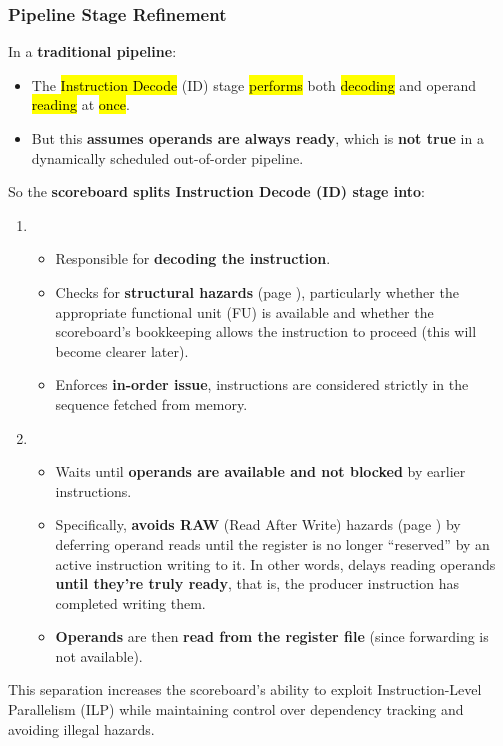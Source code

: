 \subsubsection{Pipeline Stage Refinement}

In a \textbf{traditional pipeline}:
\begin{itemize}
    \item The \hl{Instruction Decode} (ID) stage \hl{performs} both \hl{decoding} and operand \hl{reading} at \hl{once}.
    \item But this \textbf{assumes operands are always ready}, which is \textbf{not true} in a dynamically scheduled out-of-order pipeline.
\end{itemize}
So the \textbf{scoreboard splits Instruction Decode (ID) stage into}:
\begin{enumerate}
    \item {}
    \begin{itemize}
        \item Responsible for \textbf{decoding the instruction}.
        \item Checks for \textbf{structural hazards} (page \pageref{def: structural hazards}), particularly whether the appropriate functional unit (FU) is available and whether the scoreboard's bookkeeping allows the instruction to proceed (this will become clearer later).
        \item Enforces \textbf{in-order issue}, instructions are considered strictly in the sequence fetched from memory.
    \end{itemize}
    \item {}
    \begin{itemize}
        \item Waits until \textbf{operands are available and not blocked} by earlier instructions.
        \item Specifically, \textbf{avoids RAW} (Read After Write) hazards (page \pageref{def: Read After Write - RAW}) by deferring operand reads until the register is no longer ``reserved'' by an active instruction writing to it. In other words, delays reading operands \textbf{until they're truly ready}, that is, the producer instruction has completed writing them.
        \item \textbf{Operands} are then \textbf{read from the register file} (since forwarding is not available).
    \end{itemize}
\end{enumerate}
This separation increases the scoreboard's ability to exploit Instruction-Level Parallelism (ILP) while maintaining control over dependency tracking and avoiding illegal hazards.

